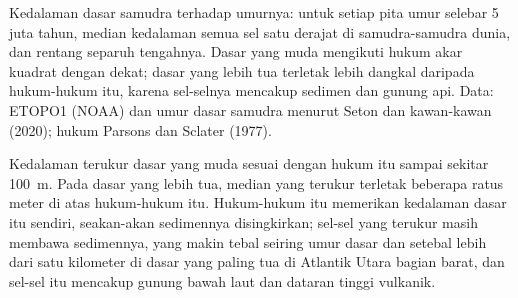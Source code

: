 \begin{omfigure}

{\small Kedalaman dasar samudra terhadap umurnya: untuk setiap pita umur selebar
5 juta tahun, median kedalaman semua sel satu derajat di samudra-samudra dunia,
dan rentang separuh tengahnya. Dasar yang muda mengikuti hukum akar kuadrat dengan
dekat; dasar yang lebih tua terletak lebih dangkal daripada hukum-hukum itu,
karena sel-selnya mencakup sedimen dan gunung api. Data: ETOPO1 (NOAA) dan umur
dasar samudra menurut Seton dan kawan-kawan (2020); hukum Parsons dan Sclater
(1977).}
\end{omfigure}

Kedalaman terukur dasar yang muda sesuai dengan hukum itu sampai sekitar
\qty{100}{m}. Pada dasar yang lebih tua, median yang terukur terletak beberapa
ratus meter di atas hukum-hukum itu. Hukum-hukum itu memerikan kedalaman dasar itu
sendiri, seakan-akan sedimennya disingkirkan; sel-sel yang terukur masih membawa
sedimennya, yang makin tebal seiring umur dasar dan setebal lebih dari satu
kilometer di dasar yang paling tua di Atlantik Utara bagian barat, dan sel-sel itu
mencakup gunung bawah laut dan dataran tinggi vulkanik.

